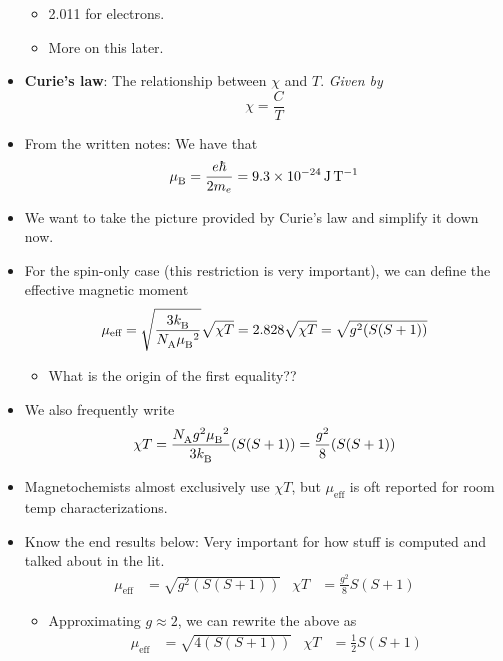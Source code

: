 \documentclass[../notes.tex]{subfiles}
\begin{document}
\begin{itemize}
\begin{itemize}
        \item 2.011 for electrons.
        \item More on this later.
    \end{itemize}
    \item \textbf{Curie's law}: The relationship between $\chi$ and $T$. \emph{Given by}
    \begin{equation*}
        \chi = \frac{C}{T}
    \end{equation*}
    \item From the written notes: We have that
    \begin{equation*}
        {\mu_\text{B}^{}} = \frac{e\hbar}{2m_e} = \SI{9.3e-24}{\joule\per\tesla}
    \end{equation*}
    \item We want to take the picture provided by Curie's law and simplify it down now.
    \item For the spin-only case (this restriction is very important), we can define the effective magnetic moment
    \begin{equation*}
        \mu_\text{eff} = \sqrt{\frac{3{k_\text{B}^{}}}{{N_\text{A}^{}}{\mu_\text{B}^{}}^2}}\sqrt{\chi T}
        = 2.828\sqrt{\chi T}
        = \sqrt{g^2(S(S+1))}
    \end{equation*}
    \begin{itemize}
        \item What is the origin of the first equality??
    \end{itemize}
    \item We also frequently write
    \begin{equation*}
        \chi T = \frac{{N_\text{A}^{}} g^2{\mu_\text{B}^{}}^2}{3{k_\text{B}^{}}}(S(S+1))
        = \frac{g^2}{8}(S(S+1))
    \end{equation*}
    \item Magnetochemists almost exclusively use $\chi T$, but $\mu_\text{eff}$ is oft reported for room temp characterizations.
    \item Know the end results below: Very important for how stuff is computed and talked about in the lit.
    \begin{align*}
        \mu_\text{eff} &= \sqrt{g^2(S(S+1))}&
        \chi T &= \frac{g^2}{8}S(S+1)
    \end{align*}
    \begin{itemize}
        \item Approximating $g\approx 2$, we can rewrite the above as
        \begin{align*}
            \mu_\text{eff} &= \sqrt{4(S(S+1))}&
            \chi T &= \frac{1}{2}S(S+1)

\end{align*}
\end{itemize}
\end{itemize}
\end{document}
